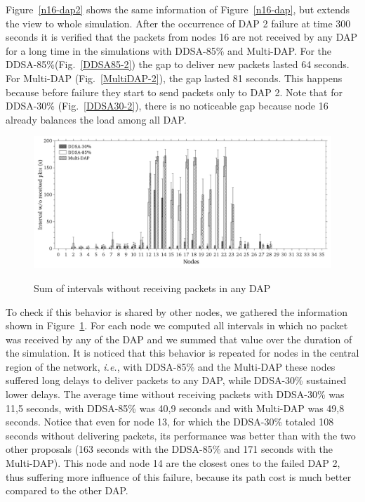 \documentclass[conference]{IEEEtran}
\begin{document}
Figure~\ref{n16-dap2} shows the same information of Figure~\ref{n16-dap}, but extends the view to whole simulation. 
After the occurrence of DAP 2 failure at time 300 seconds it is verified that the packets from nodes 16 are not received by any DAP for a long time in the simulations with DDSA-85\% and Multi-DAP.
For the DDSA-85\%(Fig.~\ref{DDSA85-2}) the gap to deliver new packets lasted 64 seconds. For Multi-DAP (Fig.~\ref{MultiDAP-2}), the gap lasted 81 seconds. This happens because before failure they start to send packets only to DAP 2. Note that for DDSA-30\% (Fig.~\ref{DDSA30-2}), there is no noticeable gap because node 16 already balances the load among all DAP.

\begin{figure}[ht]
  \centering
  \label{intv-dap}{\includegraphics[scale=.21]{IEEE-consolidados/G-wo-rcv-pkt.jpg}} 
  \caption{Sum of intervals without receiving packets in any DAP}
  \label{sum-intv}
\end{figure}


To check if this behavior is shared by other nodes, we gathered the information shown in Figure~\ref{sum-intv}. For each node we computed all intervals in which no packet was received by any of the DAP and we summed that value over the duration of the simulation.
 It is noticed that this behavior is repeated for nodes in the central region of the network, \textit{i.e.}, with DDSA-85\% and the Multi-DAP these nodes suffered long delays to deliver packets to any DAP, while DDSA-30\% sustained lower delays. The average time without receiving packets with DDSA-30\% was 11,5 seconds, with DDSA-85\% was 40,9 seconds and with Multi-DAP was 49,8 seconds. 
Notice that even for node 13, for which the DDSA-30\% totaled 108 seconds without delivering packets, its performance was better than with the two other proposals (163 seconds with the DDSA-85\% and 171 seconds with the Multi-DAP). This node and node 14 are the closest ones to the failed DAP 2, thus suffering more influence of this failure, because its path cost is much better compared to the other DAP.
\end{document}
